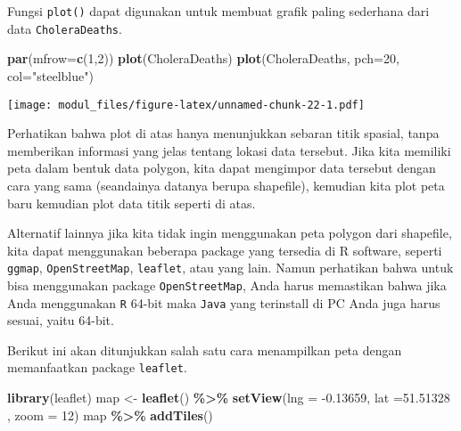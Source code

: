 \documentclass[
]{book}
\newenvironment{Shaded}{\begin{snugshade}}{\end{snugshade}}
\newcommand{\DataTypeTok}[1]{\textcolor[rgb]{0.13,0.29,0.53}{#1}}
\newcommand{\DecValTok}[1]{\textcolor[rgb]{0.00,0.00,0.81}{#1}}
\newcommand{\FloatTok}[1]{\textcolor[rgb]{0.00,0.00,0.81}{#1}}
\newcommand{\KeywordTok}[1]{\textcolor[rgb]{0.13,0.29,0.53}{\textbf{#1}}}
\newcommand{\NormalTok}[1]{#1}
\newcommand{\OperatorTok}[1]{\textcolor[rgb]{0.81,0.36,0.00}{\textbf{#1}}}
\newcommand{\StringTok}[1]{\textcolor[rgb]{0.31,0.60,0.02}{#1}}
\begin{document}
Fungsi \texttt{plot()} dapat digunakan untuk membuat grafik paling sederhana dari data \texttt{CholeraDeaths}.

\begin{Shaded}
\begin{Highlighting}[]
\KeywordTok{par}\NormalTok{(}\DataTypeTok{mfrow=}\KeywordTok{c}\NormalTok{(}\DecValTok{1}\NormalTok{,}\DecValTok{2}\NormalTok{))}
\KeywordTok{plot}\NormalTok{(CholeraDeaths)}
\KeywordTok{plot}\NormalTok{(CholeraDeaths, }\DataTypeTok{pch=}\DecValTok{20}\NormalTok{, }\DataTypeTok{col=}\StringTok{"steelblue"}\NormalTok{)}
\end{Highlighting}
\end{Shaded}

\texttt{[image: modul\_files/figure-latex/unnamed-chunk-22-1.pdf]}

Perhatikan bahwa plot di atas hanya menunjukkan sebaran titik spasial, tanpa memberikan informasi yang jelas tentang lokasi data tersebut. Jika kita memiliki peta dalam bentuk data polygon, kita dapat mengimpor data tersebut dengan cara yang sama (seandainya datanya berupa shapefile), kemudian kita plot peta baru kemudian plot data titik seperti di atas.

Alternatif lainnya jika kita tidak ingin menggunakan peta polygon dari shapefile, kita dapat menggunakan beberapa package yang tersedia di R software, seperti \texttt{ggmap}, \texttt{OpenStreetMap}, \texttt{leaflet}, atau yang lain. Namun perhatikan bahwa untuk bisa menggunakan package \texttt{OpenStreetMap}, Anda harus memastikan bahwa jika Anda menggunakan \texttt{R} 64-bit maka \texttt{Java} yang terinstall di PC Anda juga harus sesuai, yaitu 64-bit.

Berikut ini akan ditunjukkan salah satu cara menampilkan peta dengan memanfaatkan package \texttt{leaflet}.

\begin{Shaded}
\begin{Highlighting}[]
\KeywordTok{library}\NormalTok{(leaflet)}
\NormalTok{map \textless{}{-}}\StringTok{ }\KeywordTok{leaflet}\NormalTok{() }\OperatorTok{\%\textgreater{}\%}\StringTok{ }\KeywordTok{setView}\NormalTok{(}\DataTypeTok{lng =}  \FloatTok{{-}0.13659}\NormalTok{, }\DataTypeTok{lat =}\FloatTok{51.51328}\NormalTok{ , }\DataTypeTok{zoom =} \DecValTok{12}\NormalTok{)}
\NormalTok{map }\OperatorTok{\%\textgreater{}\%}\StringTok{ }\KeywordTok{addTiles}\NormalTok{() }
\end{Highlighting}
\end{Shaded}
\end{document}

